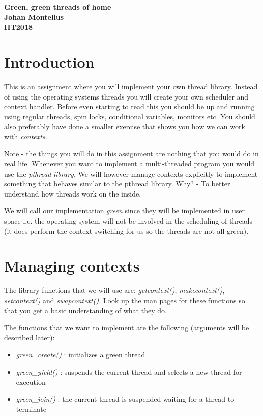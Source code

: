 \documentclass[a4paper,11pt]{article}
\begin{document}
\begin{center} \vspace{20pt} \textbf{\large Green, green threads of home}\\
 
\vspace{10pt} \textbf{Johan Montelius}\\ \vspace{10pt} \textbf{HT2018}
\end{center}


\section{Introduction}

This is an assignment where you will implement your own thread
library. Instead of using the operating systems threads you will
create your own scheduler and context handler. Before even starting to
read this you should be up and running using regular threads, spin
locks, conditional variables, monitors etc. You should also preferably
have done a smaller exercise that shows you how we can work with {\em
 contexts}.

Note - the things you will do in this assignment are nothing that you
would do in real life. Whenever you want to implement a
multi-threaded program you would use the {\em pthread library}. We
will however manage contexts explicitly to implement something that
behaves similar to the pthread library. Why? - To better understand
how threads work on the inside.

We will call our implementation {\em green} since they will be
implemented in user space i.e. the operating system will not be
involved in the scheduling of threads (it does perform the context
switching for us so the threads are not all green).


\section{Managing contexts}

The library functions that we will use are: {\em getcontext()}, {\em
  makecontext()}, {\em setcontext()} and {\em swapcontext()}. Look up
the man pages for these functions so that you get a basic
understanding of what they do. 

The functions that we want to implement are the following (arguments
will be described later):

\begin{itemize}
\item {\em green\_create()} : initializes a green thread
\item {\em green\_yield()} : suspends the current thread and selects a new thread for execution
\item {\em green\_join()} : the current thread is suspended waiting for a thread to terminate
\end{itemize}
\end{document}
